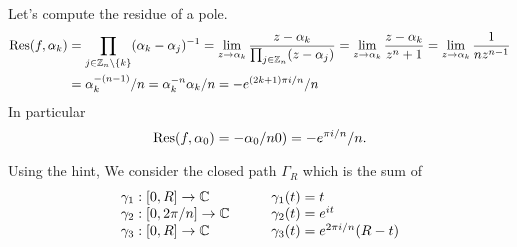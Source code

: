\begin{enumerate}
\iffalse
Let's compute the residue of the ``first'' pole.
\begin{align*}
\Res(f, \alpha_0) 
&= \prod_{j\in \Z_n\setminus\{0\}} (\alpha_0 - \alpha_j)^{-1}
 = \lim_{z\to\alpha_0} \frac{z-\alpha_0}{\prod_{j\in \Z_n} (z - \alpha_j)}
 = \lim_{z\to\alpha_0} \frac{z-\alpha_0}{z^n+1} 
 = \lim_{z\to\alpha_0}\frac{1}{nz^{n-1}} \\
&= e^{\pi i/n}/n
\end{align*}
\fi 

Let's compute the residue of a pole.
\begin{align*}
\mathop{\rm Res}\nolimits(f, \alpha_k) 
&= \prod_{j\in \mathbb{Z}_n\setminus\{k\}} (\alpha_k - \alpha_j)^{-1}
 = \lim_{z\to\alpha_k} \frac{z-\alpha_k}{\prod_{j\in \mathbb{Z}_n} (z - \alpha_j)}
 = \lim_{z\to\alpha_k} \frac{z-\alpha_k}{z^n+1} 
 = \lim_{z\to\alpha_k}\frac{1}{nz^{n-1}} \\
&= \alpha_k^{-(n-1)}/n
 = \alpha_k^{-n}\alpha_k/n = -e^{(2k+1)\pi i/n}/n
\end{align*}
In particular 
\begin{equation*}
\mathop{\rm Res}\nolimits(f, \alpha_0) = -\alpha_0/n0) = -e^{\pi i /n}/n.
\end{equation*}

Using the hint, We consider the closed path \(\Gamma_R\)
which is the sum of
\begin{equation*}
\begin{array}{ll}
\gamma_1:[0,R]\to\mathbb{C} & \gamma_1(t) = t \\
\gamma_2:[0,2\pi/n]\to\mathbb{C} \qquad& \gamma_2(t) = e^{it} \\
\gamma_3:[0,R]\to\mathbb{C} & \gamma_3(t) = e^{2\pi i/n}(R-t) 
\end{array}
\end{equation*}


\end{enumerate}
